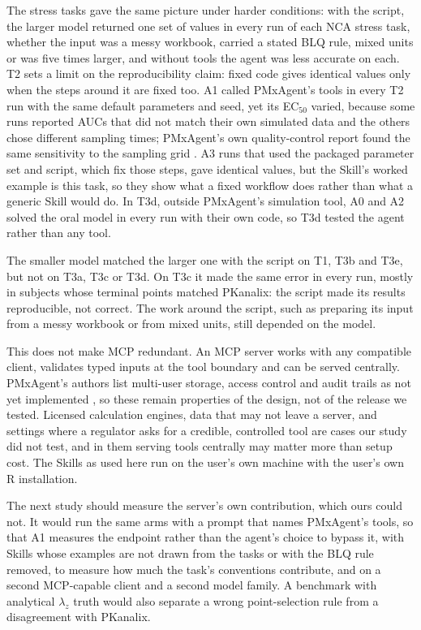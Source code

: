 \documentclass[11pt]{article}
\begin{document}
The stress tasks gave the same picture under harder conditions: with the script, the larger model returned one set of
values in every run of each NCA stress task, whether the input was a messy workbook, carried a stated BLQ rule, mixed
units or was five times larger, and without tools the agent was less accurate on each. T2 sets a limit on the
reproducibility claim: fixed code gives identical values only when the steps around it are fixed too. A1 called
PMxAgent's tools in every T2 run with the same default parameters and seed, yet its EC$_{50}$ varied, because some runs
reported AUCs that did not match their own simulated data and the others chose different sampling times; PMxAgent's own
quality-control report found the same sensitivity to the sampling grid \cite{bloomingdale2026pmxagent}. A3 runs that
used the packaged parameter set and script, which fix those steps, gave identical values, but the Skill's worked example
is this task, so they show what a fixed workflow does rather than what a generic Skill would do. In T3d, outside
PMxAgent's simulation tool, A0 and A2 solved the oral model in every run with their own code, so T3d tested the agent
rather than any tool.

The smaller model matched the larger one with the script on T1, T3b and T3e, but not on T3a, T3c or T3d. On T3c it made
the same error in every run, mostly in subjects whose terminal points matched PKanalix: the script made its results
reproducible, not correct. The work around the script, such as preparing its input from a messy workbook or from
mixed units, still depended on the model.

This does not make MCP redundant. An MCP server works with any compatible client, validates typed inputs at the tool
boundary and can be served centrally. PMxAgent's authors list multi-user storage, access control and audit trails as
not yet implemented \cite{bloomingdale2026pmxagent}, so these remain properties of the design, not of the release we
tested. Licensed calculation engines, data that may not leave a server, and settings where a regulator asks for a
credible, controlled tool \cite{fda2025ai} are cases our study did not test, and in them serving tools centrally may
matter more than setup cost. The Skills as used here run on the user's own machine with the user's own R installation.

The next study should measure the server's own contribution, which ours could not. It would run the same arms with a
prompt that names PMxAgent's tools, so that A1 measures the endpoint rather than the agent's choice to bypass it, with
Skills whose examples are not drawn from the tasks or with the BLQ rule removed, to measure how much the task's
conventions contribute, and on a second MCP-capable client and a second model family. A benchmark with analytical
$\lambda_z$ truth would also separate a wrong point-selection rule from a disagreement with PKanalix.
\end{document}
